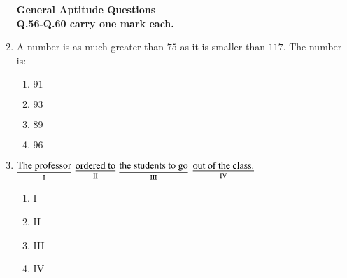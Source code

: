\documentclass[journal]{IEEEtran}
\begin{document}
\begin{enumerate}
      \textbf{General Aptitude  Questions}\\
    \textbf{Q.56-Q.60 carry one mark each.}
    \item A number is as much greater than $75$ as it is smaller than $117$. The number is:
    \begin{multicols}{4}
    \begin{enumerate}
        \item $91$
        \item $93$
        \item $89$
        \item $96$\\
    \end{enumerate}
        
    \end{multicols}
\item $\underset{\text{I}}{\text{\underline{The professor}}}$ $\underset{\text{II}}{\text{\underline{ordered to}}}$ $\underset{\text{III}}{\text{\underline{the students to go}}}$ $\underset{\text{IV}}{\text{\underline{out of the class.}}}$

\begin{multicols}{4}
\begin{enumerate}
    \item I
    \item II
    \item III
    \item IV
\end{enumerate}
    

\end{multicols}
\end{enumerate}
\end{document}

